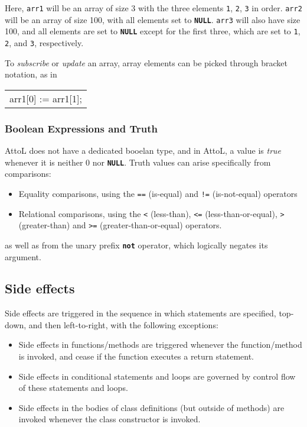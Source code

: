 \documentclass[11pt,a4paper]{article}
\newenvironment{slisting}{%
        \begin{tt}%
        \begin{tabular}{l}%
        }
        {%
        \end{tabular}%
        \end{tt}%
        }
\newcommand{\Ckw}[1]{\textbf{\texttt{#1}}}
\begin{document}
Here, \texttt{arr1} will be an array of size 3 with the three elements \texttt{1}, \texttt{2}, \texttt{3} in order.  \texttt{arr2}
will be an array of size 100, with all elements set to \Ckw{NULL}.  \texttt{arr3} will also have size 100,
and all elements are set to \Ckw{NULL} except for the first three, which are set to \texttt{1}, \texttt{2}, and \texttt{3}, respectively.

To \emph{subscribe} or \emph{update} an array, array elements can be picked through bracket notation, as in
\begin{slisting}
arr1[0] := arr1[1];
\end{slisting}

\subsubsection{Boolean Expressions and Truth}\label{sec:truth}
AttoL does not have a dedicated booelan type, and in AttoL, a value is \emph{true} whenever
it is neither 0 nor \Ckw{NULL}.  Truth values can arise specifically from comparisons:
\begin{itemize}
\item Equality comparisons, using the \texttt{==} (is-equal) and \texttt{!=} (is-not-equal) operators
\item Relational comparisons, using the \texttt{<} (less-than), \texttt{<=} (less-than-or-equal),
   \texttt{>} (greater-than) and \texttt{>=} (greater-than-or-equal) operators.
\end{itemize}
as well as from the unary prefix \Ckw{not} operator, which logically negates its argument.

\subsection{Side effects}
Side effects are triggered in the sequence in which statements are specified, top-down, and then left-to-right,
with the following exceptions:
\begin{itemize}
\item Side effects in functions/methods are triggered whenever the function/method is invoked, and cease if the function executes a return statement.
\item Side effects in conditional statements and loops are governed by control flow of these statements and loops.
\item Side effects in the bodies of class definitions (but outside of methods) are invoked whenever the class constructor is invoked.
\end{itemize}
\end{document}
